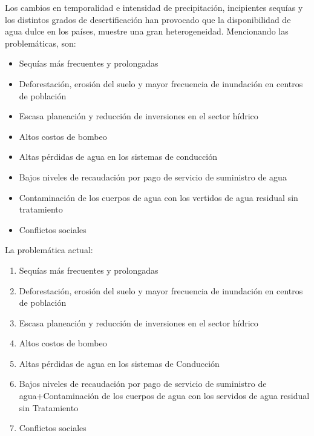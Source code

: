 Los cambios en temporalidad e intensidad de precipitación, incipientes sequías y los distintos grados de desertificación han provocado que la disponibilidad de agua dulce en los países, muestre una gran heterogeneidad.
Mencionando las problemáticas, son:
\begin{itemize}
  \item Sequías más frecuentes y prolongadas
  \item Deforestación, erosión del suelo y mayor frecuencia de inundación en centros de población
  \item Escasa planeación y reducción de inversiones en el sector hídrico
  \item Altos costos de bombeo
  \item Altas pérdidas de agua en los sistemas de conducción
  \item Bajos niveles de recaudación por pago de servicio de suministro de agua
  \item Contaminación de los cuerpos de agua con los vertidos de agua residual sin tratamiento
  \item Conflictos sociales
\end{itemize}
La problemática actual:
\begin{enumerate}
    \item Sequías más frecuentes y prolongadas
    \item Deforestación, erosión del suelo y mayor frecuencia de inundación en centros de población
    \item Escasa planeación y reducción de inversiones en el sector hídrico
    \item Altos costos de bombeo
    \item Altas pérdidas de agua en los sistemas de Conducción
    \item Bajos niveles de recaudación por pago de servicio de suministro de agua+Contaminación de los cuerpos de agua con los servidos de agua residual sin Tratamiento
    \item Conflictos sociales
\end{enumerate}


